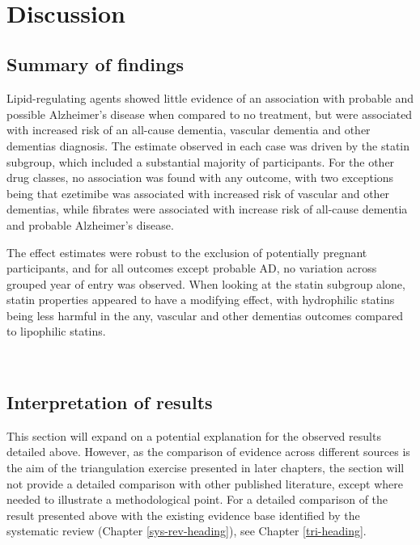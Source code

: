 \documentclass[a4paper, twoside]{templates/ociamthesis}
\begin{document}
~

\hypertarget{discussion-2}{%
\section{Discussion}\label{discussion-2}}

\hypertarget{summary-of-findings-1}{%
\subsection{Summary of findings}\label{summary-of-findings-1}}

Lipid-regulating agents showed little evidence of an association with probable and possible Alzheimer's disease when compared to no treatment, but were associated with increased risk of an all-cause dementia, vascular dementia and other dementias diagnosis. The estimate observed in each case was driven by the statin subgroup, which included a substantial majority of participants. For the other drug classes, no association was found with any outcome, with two exceptions being that ezetimibe was associated with increased risk of vascular and other dementias, while fibrates were associated with increase risk of all-cause dementia and probable Alzheimer's disease.

The effect estimates were robust to the exclusion of potentially pregnant participants, and for all outcomes except probable AD, no variation across grouped year of entry was observed. When looking at the statin subgroup alone, statin properties appeared to have a modifying effect, with hydrophilic statins being less harmful in the any, vascular and other dementias outcomes compared to lipophilic statins.

~

\hypertarget{interpretation-of-results}{%
\subsection{Interpretation of results}\label{interpretation-of-results}}

This section will expand on a potential explanation for the observed results detailed above. However, as the comparison of evidence across different sources is the aim of the triangulation exercise presented in later chapters, the section will not provide a detailed comparison with other published literature, except where needed to illustrate a methodological point. For a detailed comparison of the result presented above with the existing evidence base identified by the systematic review (Chapter \ref{sys-rev-heading}), see Chapter \ref{tri-heading}.
\end{document}

